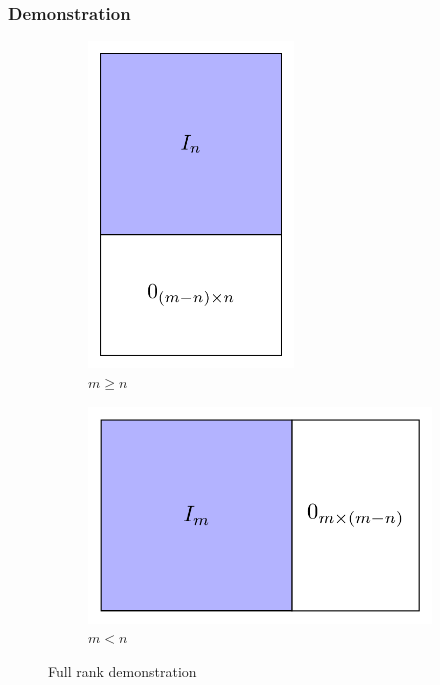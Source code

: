 \subsubsection*{Demonstration}
\begin{figure}[H]
  \centering
  \captionsetup[subfigure]{justification=centering}
  \begin{subfigure}[b]{0.4\textwidth}
    \centering
    \includegraphics[width=0.6\textwidth]{imgs/rowrank.png}
    \caption{$m \ge n$}
    \label{fig:case1}
    \end{subfigure}
    \hfill
    \begin{subfigure}[b]{0.4\textwidth}
      \centering
      \includegraphics[width=\textwidth]{imgs/colrank.png}
      \caption{$m < n$}
      \label{fig:case2}
    \end{subfigure}
    \caption{Full rank demonstration}
\end{figure}
